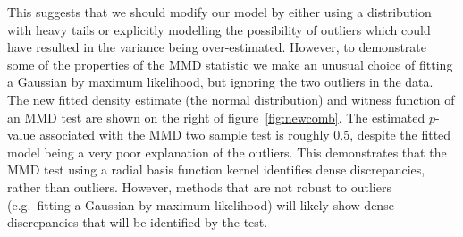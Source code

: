 \documentclass{article} %
\def\eg{e.g.\ }
\begin{document}
This suggests that we should modify our model by either using a distribution with heavy tails or explicitly modelling the possibility of outliers which could have resulted in the variance being over-estimated.
However, to demonstrate some of the properties of the MMD statistic we make an unusual choice of fitting a Gaussian by maximum likelihood, but ignoring the two outliers in the data.
The new fitted density estimate (the normal distribution) and witness function of an MMD test are shown on the right of figure~\ref{fig:newcomb}.
The estimated $p$-value associated with the MMD two sample test is roughly 0.5, despite the fitted model being a very poor explanation of the outliers.
This demonstrates that the MMD test using a radial basis function kernel identifies dense discrepancies, rather than outliers.
However, methods that are not robust to outliers (\eg fitting a Gaussian by maximum likelihood) will likely show dense discrepancies that will be identified by the test.

%
%
%
%
%
\end{document}
